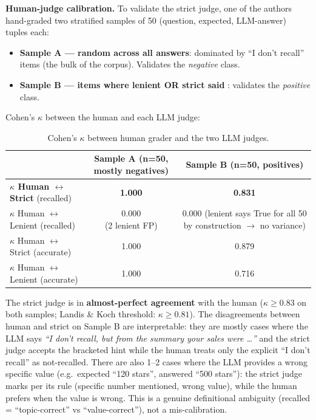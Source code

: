 \textbf{Human-judge calibration.} To validate the strict judge, one of the
authors hand-graded two stratified samples of 50 (question, expected,
LLM-answer) tuples each:

\begin{itemize}
  \item \textbf{Sample A --- random across all answers}: dominated by ``I don't recall''
    items (the bulk of the corpus). Validates the \textit{negative} class.
  \item \textbf{Sample B --- items where lenient OR strict said }:
    validates the \textit{positive} class.
\end{itemize}

Cohen's $\kappa$ between the human and each LLM judge:

\begin{table}[h]
\centering
\caption{Cohen's $\kappa$ between human grader and the two LLM judges.}
\label{tab:human-judge-kappa}
\small
\begin{tabular}{lcc}
\toprule
 & Sample A (n=50, mostly negatives) & Sample B (n=50, positives) \\
\midrule
\textbf{$\kappa$ Human $\leftrightarrow$ Strict} (recalled) & \textbf{1.000} & \textbf{0.831} \\
$\kappa$ Human $\leftrightarrow$ Lenient (recalled) & \shortstack{0.000\\(2 lenient FP)} & \shortstack{0.000\\(lenient says True for all 50\\by construction $\to$ no variance)} \\
$\kappa$ Human $\leftrightarrow$ Strict (accurate) & 1.000 & 0.879 \\
$\kappa$ Human $\leftrightarrow$ Lenient (accurate) & 1.000 & 0.716 \\
\bottomrule
\end{tabular}
\end{table}

The strict judge is in \textbf{almost-perfect agreement} with the human
($\kappa \geq 0.83$ on both samples; Landis \& Koch threshold: $\kappa \geq 0.81$). The
disagreements between human and strict on Sample B are interpretable:
they are mostly cases where the LLM says \textit{``I don't recall, but from the
summary your sales were \dots''} and the strict judge accepts the bracketed
hint while the human treats only the explicit ``I don't recall'' as
not-recalled. There are also 1--2 cases where the LLM provides a wrong
specific value (e.g.\ expected ``120 stars'', answered ``500 stars''): the
strict judge marks  per its rule
(specific number mentioned, wrong value), while the human prefers
 when the value is wrong. This is a genuine definitional
ambiguity (recalled = ``topic-correct'' vs ``value-correct''), not a
mis-calibration.

